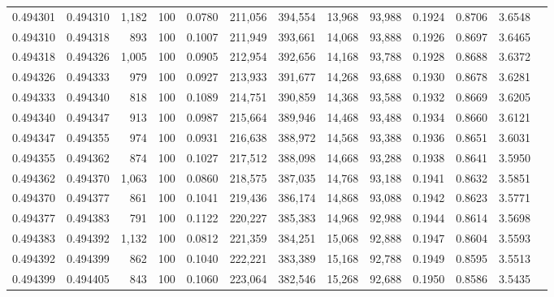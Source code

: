 \begin{tabular}{rrrrrrrrrrrrr}
0.494301 & 0.494310 & 1,182 & 100 &                                     0.0780 & 211,056 & 394,554 &  13,968 &  93,988 & 0.1924 & 0.8706 & 3.6548 \\
0.494310 & 0.494318 &   893 & 100 &                                     0.1007 & 211,949 & 393,661 &  14,068 &  93,888 & 0.1926 & 0.8697 & 3.6465 \\
0.494318 & 0.494326 & 1,005 & 100 &                                     0.0905 & 212,954 & 392,656 &  14,168 &  93,788 & 0.1928 & 0.8688 & 3.6372 \\
0.494326 & 0.494333 &   979 & 100 &                                     0.0927 & 213,933 & 391,677 &  14,268 &  93,688 & 0.1930 & 0.8678 & 3.6281 \\
0.494333 & 0.494340 &   818 & 100 &                                     0.1089 & 214,751 & 390,859 &  14,368 &  93,588 & 0.1932 & 0.8669 & 3.6205 \\
0.494340 & 0.494347 &   913 & 100 &                                     0.0987 & 215,664 & 389,946 &  14,468 &  93,488 & 0.1934 & 0.8660 & 3.6121 \\
0.494347 & 0.494355 &   974 & 100 &                                     0.0931 & 216,638 & 388,972 &  14,568 &  93,388 & 0.1936 & 0.8651 & 3.6031 \\
0.494355 & 0.494362 &   874 & 100 &                                     0.1027 & 217,512 & 388,098 &  14,668 &  93,288 & 0.1938 & 0.8641 & 3.5950 \\
0.494362 & 0.494370 & 1,063 & 100 &                                     0.0860 & 218,575 & 387,035 &  14,768 &  93,188 & 0.1941 & 0.8632 & 3.5851 \\
0.494370 & 0.494377 &   861 & 100 &                                     0.1041 & 219,436 & 386,174 &  14,868 &  93,088 & 0.1942 & 0.8623 & 3.5771 \\
0.494377 & 0.494383 &   791 & 100 &                                     0.1122 & 220,227 & 385,383 &  14,968 &  92,988 & 0.1944 & 0.8614 & 3.5698 \\
0.494383 & 0.494392 & 1,132 & 100 &                                     0.0812 & 221,359 & 384,251 &  15,068 &  92,888 & 0.1947 & 0.8604 & 3.5593 \\
0.494392 & 0.494399 &   862 & 100 &                                     0.1040 & 222,221 & 383,389 &  15,168 &  92,788 & 0.1949 & 0.8595 & 3.5513 \\
0.494399 & 0.494405 &   843 & 100 &                                     0.1060 & 223,064 & 382,546 &  15,268 &  92,688 & 0.1950 & 0.8586 & 3.5435 \\

\end{tabular}
